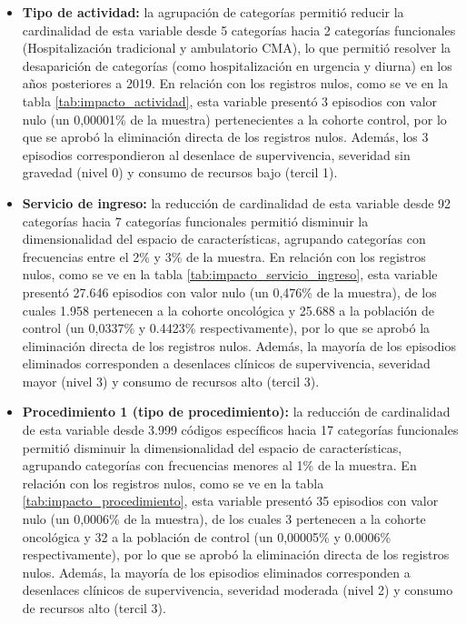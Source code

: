 \begin{itemize}
    \item \textbf{Tipo de actividad:} la agrupación de categorías permitió reducir la cardinalidad de esta variable desde 5 categorías hacia 2 categorías funcionales (Hospitalización tradicional y ambulatorio CMA), lo que permitió resolver la desaparición de categorías (como hospitalización en urgencia y diurna) en los años posteriores a 2019. En relación con los registros nulos, como se ve en la tabla \ref{tab:impacto_actividad}, esta variable presentó 3 episodios con valor nulo (un 0,00001\% de la muestra) pertenecientes a la cohorte control, por lo que se aprobó la eliminación directa de los registros nulos. Además, los 3 episodios correspondieron al desenlace de supervivencia, severidad sin gravedad (nivel 0) y consumo de recursos bajo (tercil 1).
    \item \textbf{Servicio de ingreso:} la reducción de cardinalidad de esta variable desde 92 categorías hacia 7 categorías funcionales permitió disminuir la dimensionalidad del espacio de características, agrupando categorías con frecuencias entre el 2\% y 3\% de la muestra. En relación con los registros nulos, como se ve en la tabla \ref{tab:impacto_servicio_ingreso}, esta variable presentó 27.646 episodios con valor nulo (un 0,476\% de la muestra), de los cuales 1.958 pertenecen a la cohorte oncológica y 25.688 a la población de control (un 0,0337\% y 0.4423\% respectivamente), por lo que se aprobó la eliminación directa de los registros nulos. Además, la mayoría de los episodios eliminados corresponden a desenlaces clínicos de supervivencia, severidad mayor (nivel 3) y consumo de recursos alto (tercil 3).
    \item \textbf{Procedimiento 1 (tipo de procedimiento):} la reducción de cardinalidad de esta variable desde 3.999 códigos específicos hacia 17 categorías funcionales permitió disminuir la dimensionalidad del espacio de características, agrupando categorías con frecuencias menores al 1\% de la muestra. En relación con los registros nulos, como se ve en la tabla \ref{tab:impacto_procedimiento}, esta variable presentó 35 episodios con valor nulo (un 0,0006\% de la muestra), de los cuales 3 pertenecen a la cohorte oncológica y 32 a la población de control (un 0,00005\% y 0.0006\% respectivamente), por lo que se aprobó la eliminación directa de los registros nulos. Además, la mayoría de los episodios eliminados corresponden a desenlaces clínicos de supervivencia, severidad moderada (nivel 2) y consumo de recursos alto (tercil 3).
\end{itemize}



